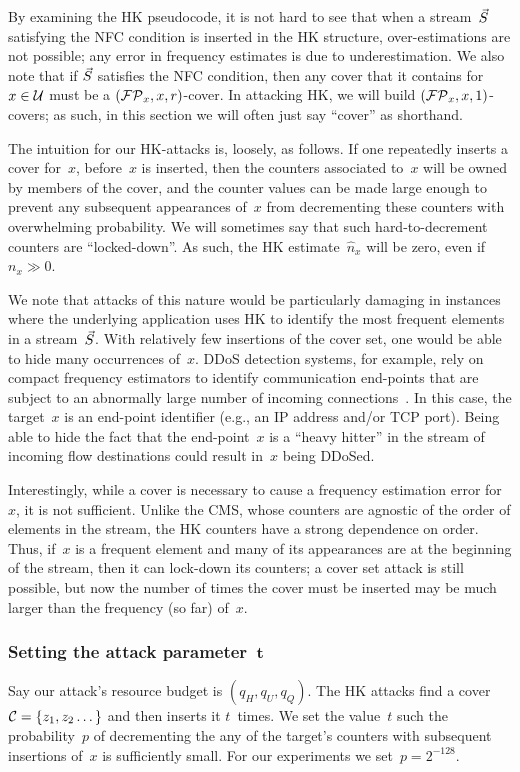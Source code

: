 By examining the HK pseudocode, it is not hard to see that when a stream~$\vec{S}$ satisfying the NFC condition is inserted in the HK structure, over-estimations are not possible; any error in frequency estimates is due to underestimation. 
%
We also note that if $\vec{S}$ satisfies the NFC condition, then any cover that it contains for $x \in \mathcal{U}$ must be a $(\mathcal{FP}_x,x,r)$-cover. In attacking HK, we will build $(\mathcal{FP}_x,x,1)$-covers; as such, in this section we will often just say ``cover'' as shorthand.  

The intuition for our HK-attacks is, loosely, as follows.  If one repeatedly inserts a cover for~$x$, before~$x$ is inserted, then the counters associated to~$x$ will be owned by members of the cover, and the counter values can be made large enough to prevent any subsequent appearances of~$x$ from decrementing these counters with overwhelming probability.  We will sometimes say that such hard-to-decrement counters are ``locked-down''. As such, the HK estimate~$\hat{n}_x$ will be zero, even if $n_x \gg 0$. 

We note that attacks of this nature would be particularly damaging in instances where the underlying application uses HK to identify the most frequent elements in a stream~$\vec{S}$. With relatively few insertions of the cover set, one would be able to hide many occurrences of~$x$.  DDoS detection systems, for example, rely on compact frequency estimators to identify communication end-points that are subject to an abnormally large number of incoming connections~\cite{Liu_Sun_Kim_2011}. In this case, the target~$x$ is an end-point identifier (e.g., an IP address and/or TCP port). Being able to hide the fact that the end-point~$x$ is a ``heavy hitter'' in the stream of incoming flow destinations could result in~$x$ being DDoSed. 

Interestingly, while a cover is necessary to cause a frequency estimation error for~$x$, it is not sufficient.  Unlike the CMS, whose counters are agnostic of the order of elements in the stream, the HK counters have a strong dependence on order.  Thus, if~$x$ is a frequent element and many of its appearances are at the beginning of the stream, then it can lock-down its counters; a cover set attack is still possible, but now the number of times the cover must be inserted may be much larger than the frequency (so far) of~$x$.  

\subsubsection{Setting the attack parameter~$\mathbf{t}$} Say our attack's resource budget is $(q_H,q_U,q_Q)$. The HK attacks find a cover $\mathcal{C} = \{z_1, z_2\dots\}$ and then inserts it $t$~times. We set the value~$t$ such the probability~$p$ of decrementing the any of the target's counters with subsequent insertions of~$x$ is sufficiently small. For our experiments we set~$p = 2^{-128}$.
 
